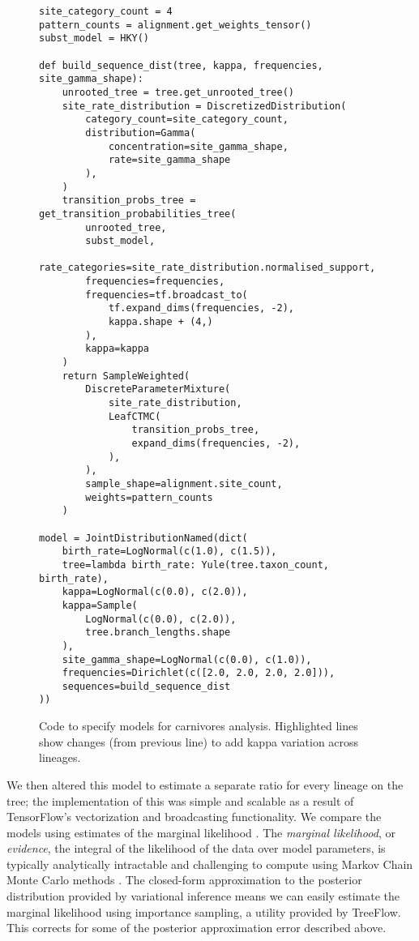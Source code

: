 \begin{figure}
    \begin{verbatim}
site_category_count = 4
pattern_counts = alignment.get_weights_tensor()
subst_model = HKY()

def build_sequence_dist(tree, kappa, frequencies, site_gamma_shape):
    unrooted_tree = tree.get_unrooted_tree()
    site_rate_distribution = DiscretizedDistribution(
        category_count=site_category_count,
        distribution=Gamma(
            concentration=site_gamma_shape,
            rate=site_gamma_shape
        ),
    )
    transition_probs_tree = get_transition_probabilities_tree(
        unrooted_tree,
        subst_model,
        rate_categories=site_rate_distribution.normalised_support,
        frequencies=frequencies,
        frequencies=tf.broadcast_to(
            tf.expand_dims(frequencies, -2),
            kappa.shape + (4,)
        ),
        kappa=kappa
    )
    return SampleWeighted(
        DiscreteParameterMixture(
            site_rate_distribution,
            LeafCTMC(
                transition_probs_tree,
                expand_dims(frequencies, -2),
            ),
        ),
        sample_shape=alignment.site_count,
        weights=pattern_counts
    )

model = JointDistributionNamed(dict(
    birth_rate=LogNormal(c(1.0), c(1.5)),
    tree=lambda birth_rate: Yule(tree.taxon_count, birth_rate),
    kappa=LogNormal(c(0.0), c(2.0)),
    kappa=Sample(
        LogNormal(c(0.0), c(2.0)),
        tree.branch_lengths.shape
    ),
    site_gamma_shape=LogNormal(c(0.0), c(1.0)),
    frequencies=Dirichlet(c([2.0, 2.0, 2.0, 2.0])),
    sequences=build_sequence_dist
))
    \end{verbatim}
    \label{fig:carnivorescode}
    \caption{Code to specify models for carnivores analysis. Highlighted lines show changes (from previous line) to add kappa variation across lineages.}
\end{figure}

We then altered this model to estimate a separate ratio for every lineage on the tree; the implementation of this was simple and scalable as a result of TensorFlow's vectorization and broadcasting functionality. We compare the models using estimates of the marginal likelihood \cite{mackay2003information}. The \textit{marginal likelihood}, or \textit{evidence}, the integral of the likelihood of the data over model parameters, is typically analytically intractable and challenging to compute using Markov Chain Monte Carlo methods \cite{xie2011improving}. The closed-form approximation to the posterior distribution provided by variational inference means we can easily estimate the marginal likelihood using importance sampling, a utility provided by TreeFlow. This corrects for some of the posterior approximation error described above.


